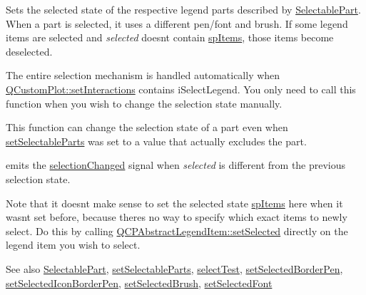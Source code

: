Sets the selected state of the respective legend parts described by \mbox{\hyperlink{class_q_c_p_legend_a5404de8bc1e4a994ca4ae69e2c7072f1}{Selectable\+Part}}. When a part is selected, it uses a different pen/font and brush. If some legend items are selected and {\itshape selected} doesn\textquotesingle{}t contain \mbox{\hyperlink{class_q_c_p_legend_a5404de8bc1e4a994ca4ae69e2c7072f1a768bfb95f323db4c66473375032c0af7}{sp\+Items}}, those items become deselected.

The entire selection mechanism is handled automatically when \mbox{\hyperlink{class_q_custom_plot_a5ee1e2f6ae27419deca53e75907c27e5}{Q\+Custom\+Plot\+::set\+Interactions}} contains i\+Select\+Legend. You only need to call this function when you wish to change the selection state manually.

This function can change the selection state of a part even when \mbox{\hyperlink{class_q_c_p_legend_a9ce60aa8bbd89f62ae4fa83ac6c60110}{set\+Selectable\+Parts}} was set to a value that actually excludes the part.

emits the \mbox{\hyperlink{class_q_c_p_legend_a82c88464edac07a9eefaf3906268df3b}{selection\+Changed}} signal when {\itshape selected} is different from the previous selection state.

Note that it doesn\textquotesingle{}t make sense to set the selected state \mbox{\hyperlink{class_q_c_p_legend_a5404de8bc1e4a994ca4ae69e2c7072f1a768bfb95f323db4c66473375032c0af7}{sp\+Items}} here when it wasn\textquotesingle{}t set before, because there\textquotesingle{}s no way to specify which exact items to newly select. Do this by calling \mbox{\hyperlink{class_q_c_p_abstract_legend_item_a6eed93b0ab99cb3eabb043fb08179c2b}{Q\+C\+P\+Abstract\+Legend\+Item\+::set\+Selected}} directly on the legend item you wish to select.

\begin{DoxySeeAlso}{See also}
\mbox{\hyperlink{class_q_c_p_legend_a5404de8bc1e4a994ca4ae69e2c7072f1}{Selectable\+Part}}, \mbox{\hyperlink{class_q_c_p_legend_a9ce60aa8bbd89f62ae4fa83ac6c60110}{set\+Selectable\+Parts}}, \mbox{\hyperlink{class_q_c_p_legend_aa53507624491908fb3d1a514b1fc674e}{select\+Test}}, \mbox{\hyperlink{class_q_c_p_legend_a2c35d262953a25d96b6112653fbefc88}{set\+Selected\+Border\+Pen}}, \mbox{\hyperlink{class_q_c_p_legend_ade93aabe9bcccaf9cf46cec22c658027}{set\+Selected\+Icon\+Border\+Pen}}, \mbox{\hyperlink{class_q_c_p_legend_a875227f3219c9799464631dec5e8f1bd}{set\+Selected\+Brush}}, \mbox{\hyperlink{class_q_c_p_legend_ab580a01c3c0a239374ed66c29edf5ad2}{set\+Selected\+Font}} 
\end{DoxySeeAlso}
\mbox{\label{class_q_c_p_legend_a7674dfc7a1f30e1abd1018c0ed45e0bc}} 
